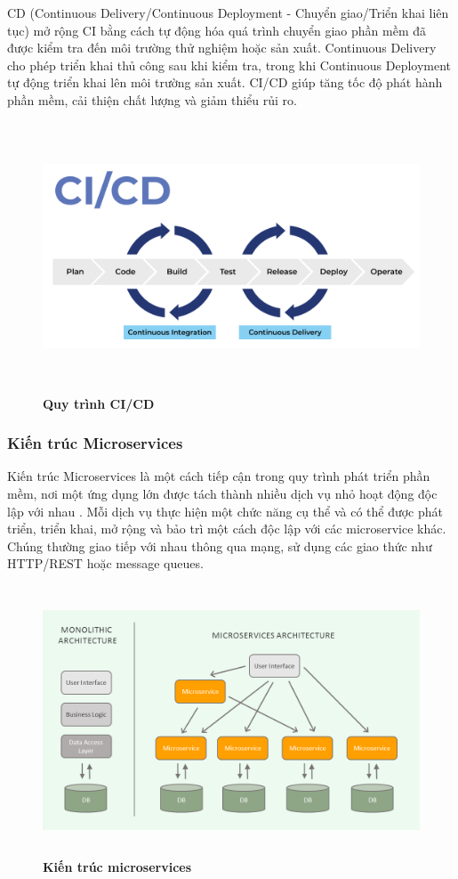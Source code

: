 CD (Continuous Delivery/Continuous Deployment - Chuyển giao/Triển khai liên tục) mở rộng CI bằng cách tự động hóa quá trình chuyển giao phần mềm đã được kiểm tra đến môi trường thử nghiệm hoặc sản xuất. Continuous Delivery cho phép triển khai thủ công sau khi kiểm tra, trong khi Continuous Deployment tự động triển khai lên môi trường sản xuất. CI/CD giúp tăng tốc độ phát hành phần mềm, cải thiện chất lượng và giảm thiểu rủi ro.
\begin{figure}[H]
	\centering
	\includegraphics[width=15cm,height=8cm]{Images/Technology/cicd.png}
	\caption[Quy trình CI/CD]{\bfseries \fontsize{12pt}{0pt}
		\selectfont Quy trình CI/CD}
	\label{cicd} %
\end{figure}

\subsubsection{Kiến trúc Microservices}
Kiến trúc Microservices là một cách tiếp cận trong quy trình phát triển phần mềm, nơi một ứng dụng lớn được tách thành nhiều dịch vụ nhỏ hoạt động độc lập với nhau \cite{microservice}.
Mỗi dịch vụ thực hiện một chức năng cụ thể và có thể được phát triển, triển khai, mở rộng và bảo trì một cách độc lập với các microservice khác. Chúng thường giao tiếp với nhau thông qua mạng, sử dụng các giao thức như HTTP/REST hoặc message queues.

\begin{figure}[H]
	\centering
	\includegraphics[width=15cm,height=8cm]{Images/Technology/microservice.png}
	\caption[Kiến trúc microservices]{\bfseries \fontsize{12pt}{0pt}
		\selectfont Kiến trúc microservices}
	\label{microservice} %
\end{figure}

